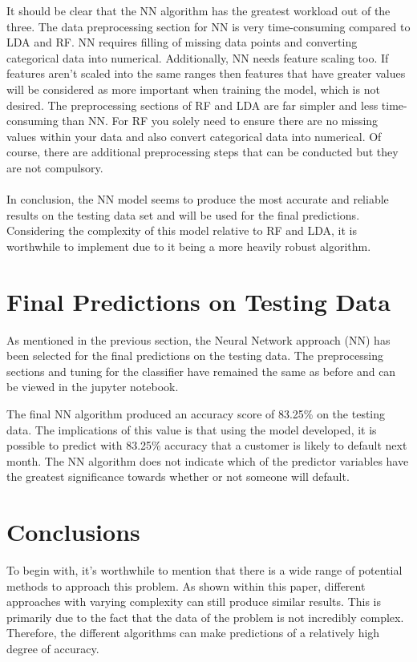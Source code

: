 \documentclass{article}
\begin{document}
It should be clear that the NN algorithm has the greatest workload out of the three. The data preprocessing section for NN is very time-consuming compared to LDA and RF. NN requires filling of missing data points and converting categorical data into numerical. Additionally, NN needs feature scaling too. If features aren’t scaled into the same ranges then features that have greater values will be considered as more important when training the model, which is not desired. The preprocessing sections of RF and LDA are far simpler and less time-consuming than NN. For RF you solely need to ensure there are no missing values within your data and also convert categorical data into numerical. Of course, there are additional preprocessing steps that can be conducted but they are not compulsory.\\ \\
 
In conclusion, the NN model seems to produce the most accurate and reliable results on the testing data set and will be used for the final predictions. Considering the complexity of this model relative to RF and LDA, it is worthwhile to implement due to it being a more heavily robust algorithm.

\section{Final Predictions on Testing Data}
As mentioned in the previous section, the Neural Network approach (NN) has been selected for the final predictions on the testing data. The preprocessing sections and tuning for the classifier have remained the same as before and can be viewed in the jupyter notebook.

The final NN algorithm produced an accuracy score of 83.25\% on the testing data. The implications of this value is that using the model developed, it is possible to predict with 83.25\% accuracy that a customer is likely to default next month. The NN algorithm does not indicate which of the predictor variables have the greatest significance towards whether or not someone will default. 


\section{Conclusions}
To begin with,  it's worthwhile to mention that there is a wide range of potential methods to approach this problem.  As shown within this paper, different approaches with varying complexity can still produce similar results. This is primarily due to the fact that the data of the problem is not incredibly complex. Therefore, the different algorithms can make predictions of a relatively high degree of accuracy. 
\end{document}
